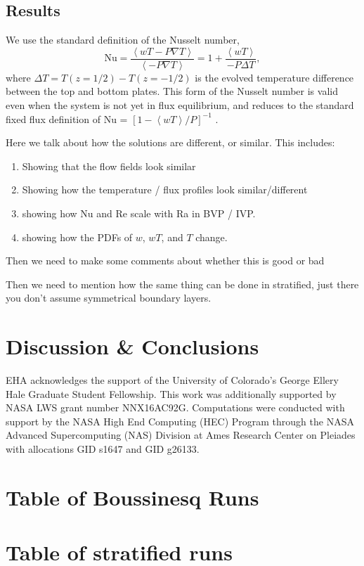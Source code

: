 \documentclass[aps, pre, onecolumn, nofootinbib, notitlepage, groupedaddress, amsfonts, amssymb, amsmath, longbibliography]{revtex4-1}
\newcommand{\angles}[1]{\ensuremath{\left\langle #1 \right\rangle}}
\newcommand{\grad}{\ensuremath{\nabla}}
\begin{document}
\subsection{Results}
We use the standard definition of the Nusselt number,
\begin{equation}
\text{Nu} = \frac{\angles{wT - P\grad T}}{\angles{- P \grad T}} =
1 + \frac{\angles{wT}}{-P\Delta T},
\end{equation}
where $\Delta T = T(z = 1/2) - T(z = -1/2)$ is the evolved temperature difference
between the top and bottom plates.  This form of the Nusselt number is valid even when
the system is not yet in flux equilibrium, and reduces to the standard fixed flux definition
of Nu  = $[1 - \angles{wT} / P]^{-1}$ \cite{johnston&doering2009}.

Here we talk about how the solutions are different, or similar.  This includes:
\begin{enumerate}
\item Showing that the flow fields look similar
\item Showing how the temperature / flux profiles look similar/different
\item showing how Nu and Re scale with Ra in BVP / IVP.
\item showing how the PDFs of $w$, $wT$, and $T$ change.
\end{enumerate}

Then we need to make some comments about whether this is good or bad

Then we need to mention how the same thing can be done in stratified, just there you don't
assume symmetrical boundary layers.





\section{Discussion \& Conclusions}
\label{sec:results}




\begin{acknowledgments}
EHA acknowledges the support of the University of Colorado's George 
Ellery Hale Graduate Student Fellowship.
This work was additionally supported by  NASA LWS grant number NNX16AC92G.  
Computations were conducted 
with support by the NASA High End Computing (HEC) Program through the NASA 
Advanced Supercomputing (NAS) Division at Ames Research Center on Pleiades
with allocations GID s1647 and GID g26133.
\end{acknowledgments}


\appendix
\section{Table of Boussinesq Runs}



\section{Table of stratified runs}



\end{document}
